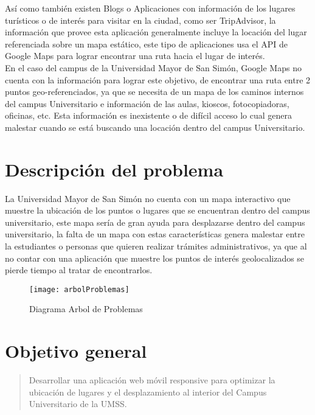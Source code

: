   Así como también existen Blogs o Aplicaciones con información de los lugares turísticos o de interés para visitar en la ciudad, como ser TripAdvisor, la información que provee esta aplicación generalmente incluye la locación del lugar referenciada sobre un mapa estático, este tipo de aplicaciones usa el API de Google Maps para lograr encontrar una ruta hacia el lugar de interés.\\


  En el caso del campus de la Universidad Mayor de San Simón, Google Maps no cuenta con la información para lograr este objetivo, de encontrar una ruta entre 2 puntos geo-referenciados, ya que se necesita de un mapa de los caminos internos del campus Universitario e información de las aulas, kioscos, fotocopiadoras, oficinas, etc. Esta información es inexistente o de difícil acceso lo cual genera malestar cuando se está buscando una locación dentro del campus Universitario.



  \section{Descripción del problema} %
  \label{sec:desc_probl}
  La Universidad Mayor de San Simón no cuenta con un mapa interactivo que
  muestre la ubicación de los puntos o lugares que se encuentran dentro del
  campus universitario, este mapa sería de gran ayuda para desplazarse dentro
  del campus universitario, la falta de un mapa con estas características
  genera malestar entre la estudiantes o personas que quieren realizar trámites
  administrativos, ya que al no contar con una aplicación que muestre los puntos de interés  geolocalizados se pierde tiempo al tratar de encontrarlos.



  \begin{figure}[H]
    \begin{center}
      \texttt{[image: arbolProblemas]}
    \end{center}
    \caption{Diagrama Arbol de Problemas}
    \label{fig:arbolProblemas}
  \end{figure}

  \section{Objetivo general} %
  \label{sec:objetivo_general}
    \begin{quote}
      Desarrollar una aplicación web móvil responsive para optimizar la ubicación de lugares y el  desplazamiento al interior del Campus Universitario de la UMSS.
    \end{quote}


